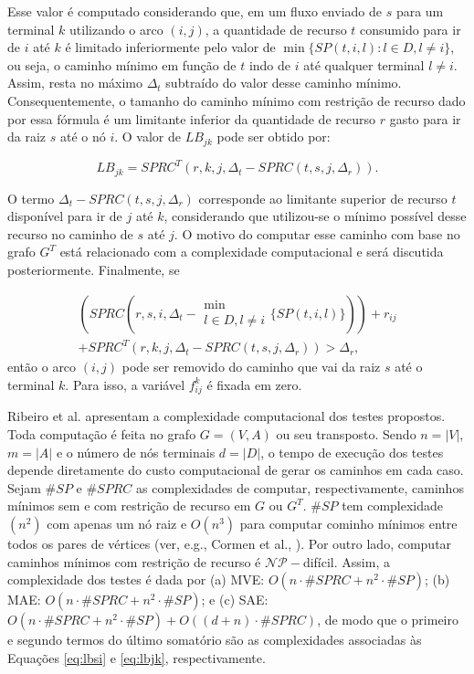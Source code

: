 Esse valor  é computado  considerando que, em  um fluxo enviado  de $s$  para um
terminal $k$ utilizando  o arco $(i, j)$, a quantidade  de recurso $t$ consumido
para ir de  $i$ até $k$ é  limitado inferiormente pelo valor  de $\min\{SP(t, i,
l): l \in D, l \neq i\}$, ou seja, o caminho mínimo em função de $t$ indo de $i$
até qualquer terminal $l \neq i$. Assim, resta no máximo $\Delta_t$ subtraído do
valor desse  caminho mínimo. Consequentemente,  o tamanho do caminho  mínimo com
restrição de recurso dado por essa fórmula é um limitante inferior da quantidade
de recurso $r$ gasto para ir da raiz $s$ até o nó $i$. O valor de $LB_{jk}$ pode
ser obtido por:

\begin{equation}
    LB_{jk} = SPRC^{T}(r, k, j, \Delta_t - SPRC(t, s, j, \Delta_r)). \label{eq:lbjk}
\end{equation}

O termo $\Delta_t  - SPRC(t, s, j, \Delta_r)$ corresponde  ao limitante superior
de recurso $t$ disponível para ir de $j$ até $k$, considerando que utilizou-se o
mínimo possível desse  recurso no caminho de  $s$ até $j$. O  motivo do computar
esse  caminho com  base  no  grafo $G^T$  está  relacionado  com a  complexidade
computacional e será discutida posteriormente. Finalmente, se

\begin{multline}
  \left( SPRC(r, s, i, \Delta_t - \substack{\min \\ l \in D, l \neq i} \{SP(t, i, l)\})\right) + r_{ij}\\ +
  SPRC^{T}(r, k, j, \Delta_t - SPRC(t, s, j, \Delta_r)) > \Delta_r,
\end{multline}
então o  arco $(i, j)$ pode  ser removido do caminho  que vai da raiz  $s$ até o
terminal  $k$. Para isso, a variável $f_{ij}^k$ é fixada em zero.

Ribeiro  et al.  \cite{tiago:2019} apresentam  a complexidade  computacional dos
testes  propostos.  Toda computação  é  feita  no grafo  $G  =  (V, A)$  ou  seu
transposto. Sendo $n = |V|$, $m = |A|$ e  o número de nós terminais $d = |D|$, o
tempo de execução dos testes depende diretamente do custo computacional de gerar
os caminhos em cada caso. Sejam  $\#SP$ e $\#SPRC$ as complexidades de computar,
respectivamente,  caminhos mínimos  sem e  com restrição  de recurso  em $G$  ou
$G^T$. $\#SP$  tem complexidade $(n^2)$  com apenas um  nó raiz e  $O(n^3)$ para
computar cominho mínimos entre todos os  pares de vértices (ver, e.g., Cormen et
al.,  \cite{cormen:2009}).  Por  outro   lado,  computar  caminhos  mínimos  com
restrição de recurso é $\mathcal{NP}-$difícil.  Assim, a complexidade dos testes
é dada por  (a) MVE: $O(n \cdot \#SPRC  + n^2 \cdot \#SP)$; (b)  MAE: $O(n \cdot
\#SPRC + n^2 \cdot \#SP)$; e (c) SAE: $O(n \cdot \#SPRC + n^2 \cdot \#SP) + O((d
+ n) \cdot \#SPRC)$, de modo que o primeiro e segundo termos do último somatório
são as  complexidades associadas às Equações  \eqref{eq:lbsi} e \eqref{eq:lbjk},
respectivamente.

